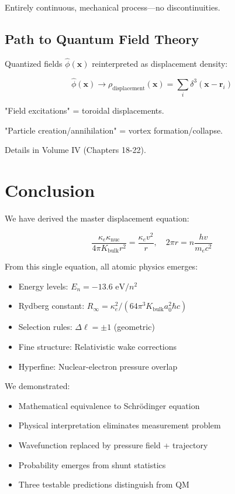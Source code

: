 Entirely continuous, mechanical process—no discontinuities.

\subsection{Path to Quantum Field Theory}

Quantized fields $\hat{\phi}(\mathbf{x})$ reinterpreted as displacement density:

\begin{equation}
\hat{\phi}(\mathbf{x}) \to \rho_{\text{displacement}}(\mathbf{x}) = \sum_i \delta^3(\mathbf{x} - \mathbf{r}_i)
\end{equation}

"Field excitations" = toroidal displacements.

"Particle creation/annihilation" = vortex formation/collapse.

Details in Volume IV (Chapters 18-22).

\section{Conclusion}

We have derived the master displacement equation:

\begin{equation}
\frac{\kappa_e \kappa_{\text{nuc}}}{4\pi K_{\text{bulk}} r^2} = \frac{\kappa_e v^2}{r}, \quad 2\pi r = n\frac{h v}{m_e c^2}
\end{equation}

From this single equation, all atomic physics emerges:

\begin{itemize}
\item Energy levels: $E_n = -13.6 \text{ eV}/n^2$
\item Rydberg constant: $R_\infty = \kappa_e^2/(64\pi^3 K_{\text{bulk}} a_0^2 \hbar c)$
\item Selection rules: $\Delta \ell = \pm 1$ (geometric)
\item Fine structure: Relativistic wake corrections
\item Hyperfine: Nuclear-electron pressure overlap
\end{itemize}

We demonstrated:

\begin{itemize}
\item Mathematical equivalence to Schrödinger equation
\item Physical interpretation eliminates measurement problem
\item Wavefunction replaced by pressure field + trajectory
\item Probability emerges from shunt statistics
\item Three testable predictions distinguish from QM
\end{itemize}

